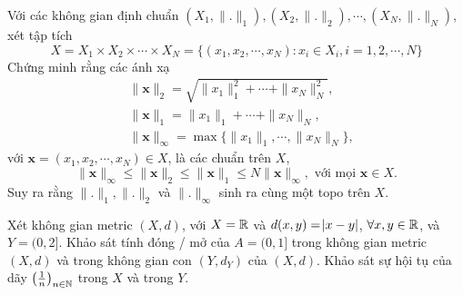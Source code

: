 \begin{exercise}{10}
    Với các không gian định chuẩn $(X_1, \|.\|_1), (X_2, \|.\|_2), \cdots, (X_N, \|.\|_N)$, xét tập tích
    $$
        X = X_1 \times X_2 \times \cdots \times X_N = \{ (x_1,x_2,\cdots,x_N): x_i \in X_i, i = 1,2,\cdots,N \}
    $$
    Chứng minh rằng các ánh xạ
    \begin{align*}
        &\|\mathbf{x}\|_2 = \sqrt{\|x_1\|_1^2 + \cdots + \|x_N\|_N^2},\\
        &\|\mathbf{x}\|_1 = \|x_1\|_1 + \cdots + \|x_N\|_N,\\
        &\|\mathbf{x}\|_{\infty} = \max\{\|x_1\|_1, \cdots, \|x_N\|_N\},
    \end{align*}
    với $\mathbf{x} = (x_1,x_2,\cdots,x_N) \in X$, là các chuẩn trên $X$,
    $$
        \|\mathbf{x}\|_{\infty} \leq \|\mathbf{x}\|_{2} \leq \|\mathbf{x}\|_{1} \leq N \|\mathbf{x}\|_{\infty}, \text{ với mọi } \mathbf{x} \in X.
    $$
    Suy ra rằng $\|.\|_1, \|.\|_2$ và $\|.\|_{\infty}$ sinh ra cùng một topo trên $X$.
\end{exercise}

\begin{exercise}{14}
    Xét không gian metric $(X,d)$, với $X=\mathbb R$ và $d(x,y)=\abs{x-y}$, $\forall x,y \in \mathbb R$, và $Y = (0,2]$. Khảo sát tính đóng / mở của $A=(0,1]$ trong không gian metric $(X,d)$ và trong không gian con $(Y,d_Y)$ của $(X,d)$. Khảo sát sự hội tụ của dãy $\left(\frac{1}{n}\right)_{n\in\mathbb N}$ trong $X$ và trong $Y$.
\end{exercise}

